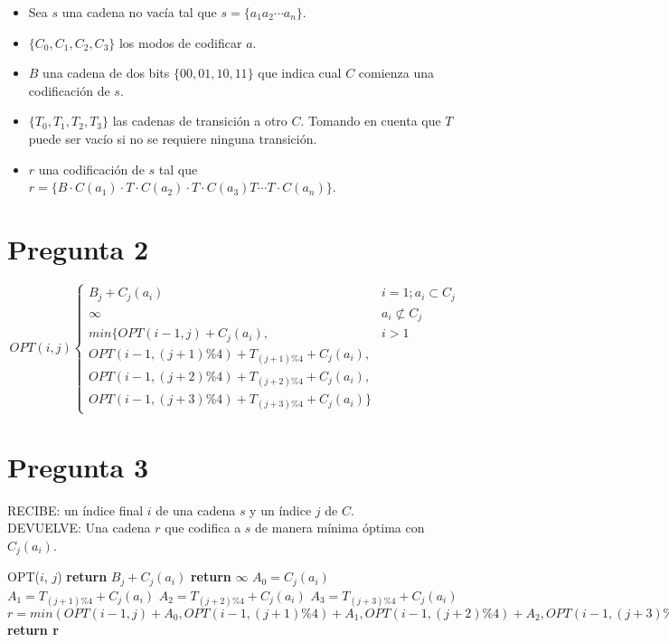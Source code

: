 \documentclass{article}
\begin{document}

    

\begin{itemize}
    \item Sea $s$ una cadena no vacía tal que $s = \{a_1a_2\cdots a_n\}$. 
    \item $\{C_0, C_1, C_2, C_3\}$ los modos de codificar $a$.
    \item $B$ una cadena de dos bits $\{00, 01, 10, 11\}$ que indica cual $C$ comienza una 
    codificación de $s$.
    \item $\{T_0, T_1, T_2, T_3\}$ las cadenas de transición a otro $C$. Tomando en cuenta que 
    $T$ puede ser vacío si no se requiere ninguna transición.
    \item $r$ una codificación de $s$ tal que $r=\{B \cdot C(a_1) \cdot T \cdot C(a_2) \cdot T 
    \cdot C(a_3) T \cdots T \cdot C(a_n)\}$.
\end{itemize}

\section{Pregunta 2}
\[ OPT(i, j) \begin{cases} 
    B_j + C_j(a_i) & i = 1; a_i \subset C_j \\
    \infty & a_i \not\subset C_j \\
    min\{OPT(i - 1, j) + C_j(a_i), & i > 1\\
    OPT(i - 1, (j+1) \%4) + T_{(j+1) \%4} + C_j(a_i), \\
    OPT(i - 1, (j+2) \%4) + T_{(j+2) \%4} +C_j(a_i), \\ OPT(i - 1, (j+3) \%4) + T_{(j+3) \%4} + C_j(a_i)\}
 \end{cases}
\]

\section{Pregunta 3}

\noindent RECIBE: un índice final $i$ de una cadena $s$ y un índice $j$ de $C$.\\
DEVUELVE: Una cadena $r$ que codifica a $s$ de manera mínima óptima con $C_j(a_i)$.

\begin{algorithmic}[1]
\item[]{OPT($i$, $j$)}
\State \textbf{return} $B_j + C_j(a_i)$
\State \textbf{return} $\infty$
\EndIf
\State $A_0 = C_j(a_i)$
\State $A_1 = T_{(j+1)\%4} + C_j(a_i)$
\State $A_2 = T_{(j+2)\%4} + C_j(a_i)$
\State $A_3 = T_{(j+3)\%4} + C_j(a_i)$
\State $r=min(OPT(i-1,j) + A_0, OPT(i-1,(j+1)\%4) + A_1, OPT(i-1,(j+2)\%4) + A_2, OPT(i-1,(j+3)\%4) + A_3)$
\State \textbf{return r} 
\end{algorithmic}
\end{document}
